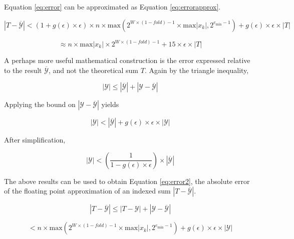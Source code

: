 \documentclass[12pt]{article}
\providecommand{\min}{\ensuremath{\text{min}}}
\providecommand{\max}{\ensuremath{\text{max}}}
\theoremstyle{definition}
\numberwithin{equation}{section}
\begin{document}
    Equation \ref{eq:error} can be approximated as Equation \ref{eq:errorapprox}.

    \begin{equation*}
      |T - \overline{\mathcal{Y}}| < (1 + g(\epsilon)\times\epsilon) \times n \times \max(2^{W \times (1 - fold) - 1} \times \max|x_k|, 2^{e_{\min} - 1}) + g(\epsilon)\times\epsilon\times|T|
    \end{equation*}

    \begin{equation}
    \approx n \times \max|x_k|\times 2^{W \times (1 - fold) - 1} + 15 \times \epsilon \times|T|
      \label{eq:errorapprox}
    \end{equation}

    A perhaps more useful mathematical construction is the error expressed relative to the result $\overline{\mathcal{Y}}$, and not the theoretical sum $T$. Again by the triangle inequality,

    \begin{equation*}
      |\mathcal{Y}| \leq |\overline{\mathcal{Y}}| + |\mathcal{Y} - \overline{\mathcal{Y}}|
    \end{equation*}

    Applying the bound on $|\mathcal{Y} - \overline{\mathcal{Y}}|$ yields

    \begin{equation*}
      |\mathcal{Y}| < |\overline{\mathcal{Y}}| + g(\epsilon)\times\epsilon\times|\mathcal{Y}|
    \end{equation*}

    After simplification,

    \begin{equation*}
      |\mathcal{Y}| < (\frac{1}{1 - g(\epsilon)\times\epsilon}) \times |\overline{\mathcal{Y}}|
    \end{equation*}

    The above results can be used to obtain Equation \ref{eq:error2}, the absolute error of the floating point approximation of an indexed sum $|T - \overline{\mathcal{Y}}|$.

    \begin{equation*}
      |T - \overline{\mathcal{Y}}| \leq |T - \mathcal{Y}| + |\mathcal{Y} - \overline{\mathcal{Y}}|
    \end{equation*}

    \begin{equation*}
      < n \times \max(2^{W \times (1 - fold) - 1} \times \max|x_k|, 2^{e_{\min} - 1}) + g(\epsilon)\times\epsilon\times|\mathcal{Y}|
    \end{equation*}
\end{document}
